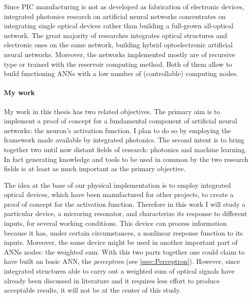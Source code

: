 Since \acs{PIC} manufacturing is not as developed as fabrication of electronic devices, integrated photonics research on artificial neural networks concentrates on integrating single optical devices rather than building a full-grown all-optical network.
The great majority of researches integrates optical structures and electronic ones on the same network, building hybrid optoelectronic artificial neural networks.
Moreover, the networks implemented mostly are of recursive type or trained with the reservoir computing method.
Both of them allow to build functioning \acp{ANN} with a low number of (controllable) computing nodes.

\paragraph{My work\\}
My work in this thesis has two related objectives.
The primary aim is to implement a proof of concept for a fundamental component of artificial neural networks: the neuron's activation function.
I plan to do so by employing the framework made available by integrated photonics.
The second intent is to bring together two until now distant fields of research: %
photonics and machine learning.
In fact generating knowledge and tools to be used in common by the two research fields is at least as much important as the primary objective.

The idea at the base of our physical implementation is to employ integrated optical devices, which have been manufactured for other projects, to create a proof of concept for the activation function.
Therefore in this work I will study a particular device, a microring resonator, and characterize its response to different inputs, for several working conditions.
This device can process information because it has, under certain circumstances, a nonlinear response function to its inputs.
Moreover, the same device might be used in another important part of \acp{ANN} nodes: the weighted sum.
With this two parts together one could claim to have built an basic \ac{ANN}, the \textit{perceptron} (see \autoref{ssec:Perceptron}).
However, since integrated structures able to carry out a weighted sum of optical signals have already been discussed in literature and it requires less effort to produce acceptable results, it will not be at the center of this study.

